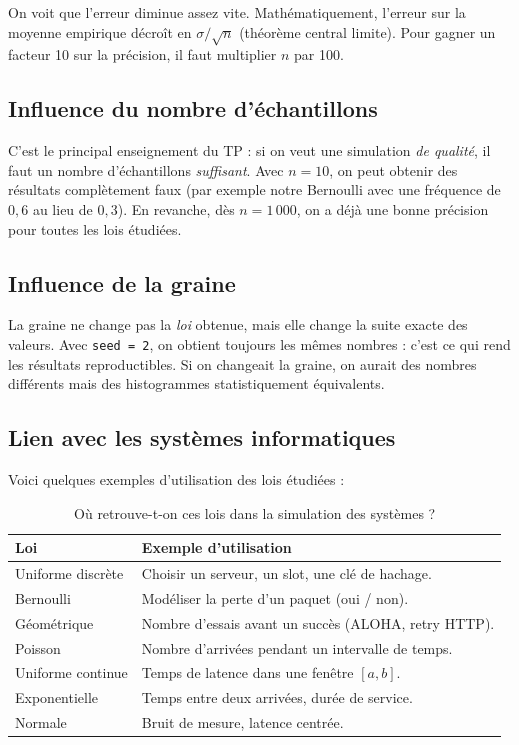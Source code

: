 \documentclass[11pt,a4paper]{article}
\begin{document}
On voit que l'erreur diminue assez vite. Math\'ematiquement, l'erreur sur
la moyenne empirique d\'ecro\^it en $\sigma/\sqrt{n}$ (th\'eor\`eme central
limite). Pour gagner un facteur 10 sur la pr\'ecision, il faut multiplier
$n$ par 100.

\subsection{Influence du nombre d'\'echantillons}

C'est le principal enseignement du TP : si on veut une simulation \emph{de
qualit\'e}, il faut un nombre d'\'echantillons \emph{suffisant}. Avec
$n = 10$, on peut obtenir des r\'esultats compl\`etement faux (par exemple
notre Bernoulli avec une fr\'equence de $0{,}6$ au lieu de $0{,}3$). En
revanche, d\`es $n = 1\,000$, on a d\'ej\`a une bonne pr\'ecision pour
toutes les lois \'etudi\'ees.

\subsection{Influence de la graine}

La graine ne change pas la \emph{loi} obtenue, mais elle change la suite
exacte des valeurs. Avec \texttt{seed = 2}, on obtient toujours les m\^emes
nombres : c'est ce qui rend les r\'esultats reproductibles. Si on changeait
la graine, on aurait des nombres diff\'erents mais des histogrammes
\og statistiquement \'equivalents\fg{}.

\subsection{Lien avec les syst\`emes informatiques}

Voici quelques exemples d'utilisation des lois \'etudi\'ees :

\begin{table}[H]
\centering
\caption{O\`u retrouve-t-on ces lois dans la simulation des syst\`emes ?}
\begin{tabular}{ll}
\toprule
Loi & Exemple d'utilisation \\
\midrule
Uniforme discr\`ete & Choisir un serveur, un slot, une cl\'e de hachage. \\
Bernoulli           & Mod\'eliser la perte d'un paquet (oui / non). \\
G\'eom\'etrique     & Nombre d'essais avant un succ\`es (ALOHA, retry HTTP). \\
Poisson             & Nombre d'arriv\'ees pendant un intervalle de temps. \\
Uniforme continue   & Temps de latence dans une fen\^etre $[a, b]$. \\
Exponentielle       & Temps entre deux arriv\'ees, dur\'ee de service. \\
Normale             & Bruit de mesure, latence centr\'ee. \\
\bottomrule
\end{tabular}
\end{table}
\end{document}
